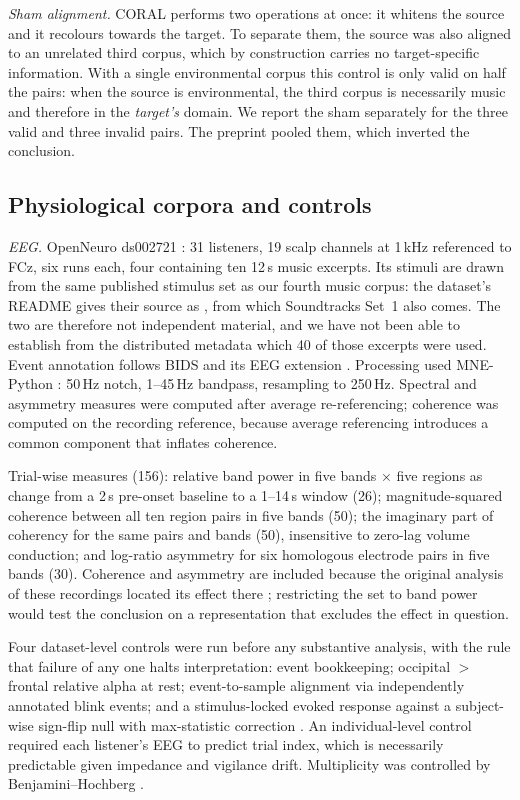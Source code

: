 \emph{Sham alignment.} CORAL performs two operations at once: it whitens the
source and it recolours towards the target. To separate them, the source was
also aligned to an unrelated third corpus, which by construction carries no
target-specific information. With a single environmental corpus this control
is only valid on half the pairs: when the source is environmental, the third
corpus is necessarily music and therefore in the \emph{target's} domain. We
report the sham separately for the three valid and three invalid pairs. The
preprint pooled them, which inverted the conclusion.

\subsection{Physiological corpora and controls}

\emph{EEG.} OpenNeuro ds002721 \cite{daly2018data}: 31 listeners, 19 scalp
channels at 1\,kHz referenced to FCz, six runs each, four containing ten 12\,s
music excerpts. Its stimuli are drawn from the same
published stimulus set as our fourth music corpus: the dataset's README gives
their source as \cite{eerola2011}, from which Soundtracks Set~1 also comes.
The two are therefore not independent material, and we have not been able to
establish from the distributed metadata which 40 of those excerpts were used. Event annotation follows BIDS and its EEG extension
\cite{gorgolewski2016, pernet2019}. Processing used MNE-Python
\cite{gramfort2013}: 50\,Hz notch, 1--45\,Hz bandpass, resampling to 250\,Hz.
Spectral and asymmetry measures were computed after average re-referencing;
coherence was computed on the recording reference, because average referencing
introduces a common component that inflates coherence.

Trial-wise measures (156): relative band power in five bands $\times$ five
regions as change from a 2\,s pre-onset baseline to a 1--14\,s window (26);
magnitude-squared coherence between all ten region pairs in five bands (50);
the imaginary part of coherency for the same pairs and bands (50),
insensitive to zero-lag volume conduction; and log-ratio asymmetry for six
homologous electrode pairs in five bands (30). Coherence and asymmetry are
included because the original analysis of these recordings located its effect
there \cite{daly2014}; restricting the set to band power would test the
conclusion on a representation that excludes the effect in question.

Four dataset-level controls were run before any substantive analysis, with the
rule that failure of any one halts interpretation: event bookkeeping; occipital
$>$ frontal relative alpha at rest; event-to-sample alignment via
independently annotated blink events; and a stimulus-locked evoked response
against a subject-wise sign-flip null with max-statistic correction
\cite{maris2007}. An individual-level control required each listener's EEG to
predict trial index, which is necessarily predictable given impedance and
vigilance drift. Multiplicity was controlled by Benjamini--Hochberg
\cite{benjamini1995}.

